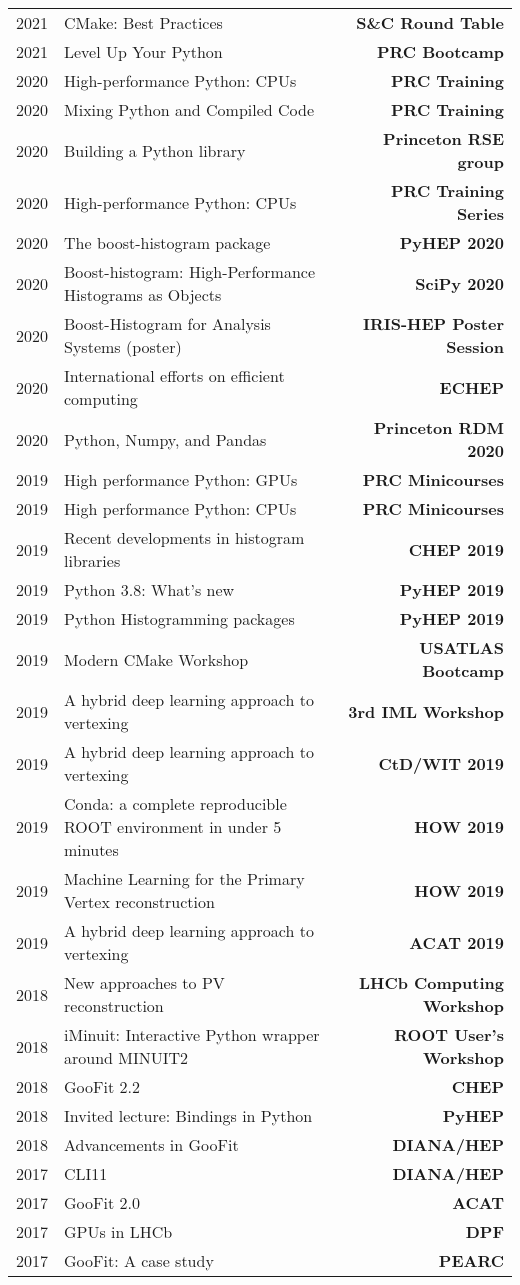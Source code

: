 \documentclass[10pt,letterpaper,english]{moderncv}
\begin{document}
\begin{tabularx}{\textwidth}{p{.35in}X>{\bfseries}r}
    2021 & CMake: Best Practices & S\&C Round Table \\
    2021 & Level Up Your Python & PRC Bootcamp \\
    2020 & High-performance Python: CPUs & PRC Training \\
    2020 & Mixing Python and Compiled Code & PRC Training \\
    2020 & Building a Python library & Princeton RSE group \\
    2020 & High-performance Python: CPUs & PRC Training Series \\
    2020 & The boost-histogram package & PyHEP 2020 \\
    2020 & Boost-histogram: High-Performance Histograms as Objects & SciPy 2020 \\
    2020 & Boost-Histogram for Analysis Systems (poster) & IRIS-HEP Poster Session \\
    2020 & International efforts on efficient computing & ECHEP \\
    2020 & Python, Numpy, and Pandas & Princeton RDM 2020 \\
    2019 & High performance Python: GPUs & PRC Minicourses \\
    2019 & High performance Python: CPUs & PRC Minicourses \\
    2019 & Recent developments in histogram libraries  & CHEP 2019 \\ 	
    2019 & Python 3.8: What's new & PyHEP 2019 \\ 	
    2019 & Python Histogramming packages & PyHEP 2019\\ 	
    2019 & Modern CMake Workshop & USATLAS Bootcamp \\ 	
    2019 & A hybrid deep learning approach to vertexing & 3rd IML Workshop \\ 	
    2019 & A hybrid deep learning approach to vertexing & CtD/WIT 2019 \\ 	
    2019 & Conda: a complete reproducible ROOT environment in under 5 minutes & HOW 2019 \\ 	
    2019 & Machine Learning for the Primary Vertex reconstruction & HOW 2019 \\ 	
    2019 & A hybrid deep learning approach to vertexing & ACAT 2019 \\ %
	2018 & New approaches to PV reconstruction & LHCb Computing Workshop \\ %
	2018 & iMinuit: Interactive Python wrapper around MINUIT2 & ROOT User's Workshop \\  %
	2018 & GooFit 2.2 & CHEP \\ %
	2018 & Invited lecture: Bindings in Python & PyHEP  \\
    2018 & Advancements in GooFit & DIANA/HEP \\
	2017 & CLI11 & DIANA/HEP \\
	2017 & GooFit 2.0 & ACAT \\
	2017 & GPUs in LHCb & DPF \\ %
	2017 & GooFit: A case study & PEARC \\
	

\end{tabularx}
\end{document}
